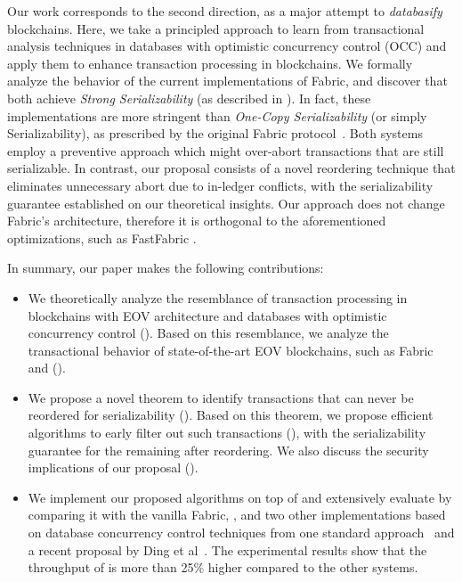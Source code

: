 Our work corresponds to the second direction, as a major attempt to
\textit{databasify} blockchains.
%
Here, we take a principled approach to learn from transactional analysis
techniques in databases with optimistic concurrency control (OCC) and apply them
to enhance transaction processing in blockchains.
%
We formally analyze the behavior of the current implementations of Fabric, and discover that both
achieve \textit{Strong Serializability} \cite{bailis2013highly} (as described in ).
%
In fact, these implementations are more stringent than
\textit{One-Copy Serializability} (or simply Serializability), as prescribed by the original Fabric protocol~\cite{androulaki2018hyperledger}.
%
Both systems employ a preventive approach which might over-abort transactions that are still serializable.
%
In contrast, our proposal consists of a novel reordering technique that
eliminates unnecessary abort due to in-ledger conflicts, with the serializability guarantee established on our theoretical insights. 
%
Our approach does not change Fabric's architecture, therefore it is orthogonal to the aforementioned optimizations, such as FastFabric \cite{gorenflo2019fastfabric}. 

In summary, our paper makes the following contributions:
\begin{itemize}
\item We theoretically analyze the resemblance of transaction processing in
  blockchains with EOV architecture and databases with optimistic concurrency
  control ().
  Based on this resemblance, we analyze the transactional behavior of
  state-of-the-art EOV blockchains, such as Fabric and {\fabricPlusplus}
  ().
  
\item We propose a novel theorem to identify transactions that can never be
  reordered for serializability 
  ().
  Based on this theorem, we propose efficient algorithms to early filter out
  such transactions (), 
  with the serializability guarantee for the remaining after reordering.
  We also discuss the security implications of our proposal ().
  

\item We implement our proposed algorithms on top of {\fs} and extensively evaluate {\fs} by comparing it with the vanilla
  Fabric, {\fabricPlusplus}, and two other implementations based on database concurrency control techniques from one standard approach~\cite{CahillRF08} and a recent proposal by Ding et al~\cite{ding2018improving}.
  The experimental results show that the throughput of {\fs} is more than 25\% higher compared to the other systems.
\end{itemize}

